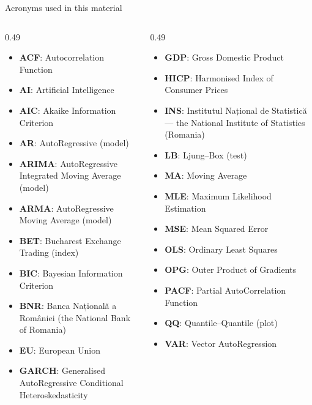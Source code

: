 \begin{frame}{Acronyms used in this material}
\begin{columns}[T]
\begin{column}{0.49\textwidth}
\begin{itemize}\setlength{\itemsep}{0pt}
    \item \textbf{ACF}: Autocorrelation Function
    \item \textbf{AI}: Artificial Intelligence
    \item \textbf{AIC}: Akaike Information Criterion
    \item \textbf{AR}: AutoRegressive (model)
    \item \textbf{ARIMA}: AutoRegressive Integrated Moving Average (model)
    \item \textbf{ARMA}: AutoRegressive Moving Average (model)
    \item \textbf{BET}: Bucharest Exchange Trading (index)
    \item \textbf{BIC}: Bayesian Information Criterion
    \item \textbf{BNR}: Banca Națională a României (the National Bank of Romania)
    \item \textbf{EU}: European Union
    \item \textbf{GARCH}: Generalised AutoRegressive Conditional Heteroskedasticity
\end{itemize}
\end{column}
\begin{column}{0.49\textwidth}
\begin{itemize}\setlength{\itemsep}{0pt}
    \item \textbf{GDP}: Gross Domestic Product
    \item \textbf{HICP}: Harmonised Index of Consumer Prices
    \item \textbf{INS}: Institutul Național de Statistică — the National Institute of Statistics (Romania)
    \item \textbf{LB}: Ljung–Box (test)
    \item \textbf{MA}: Moving Average
    \item \textbf{MLE}: Maximum Likelihood Estimation
    \item \textbf{MSE}: Mean Squared Error
    \item \textbf{OLS}: Ordinary Least Squares
    \item \textbf{OPG}: Outer Product of Gradients
    \item \textbf{PACF}: Partial AutoCorrelation Function
    \item \textbf{QQ}: Quantile–Quantile (plot)
    \item \textbf{VAR}: Vector AutoRegression
\end{itemize}
\end{column}
\end{columns}
\end{frame}

